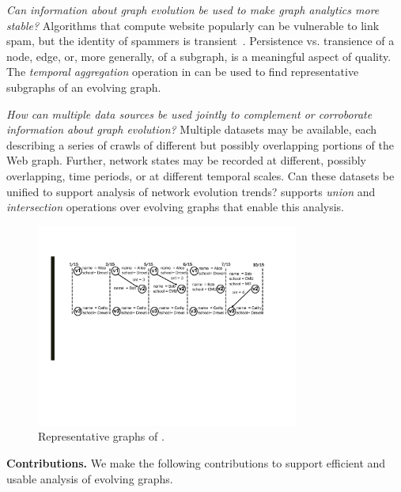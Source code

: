 {\em Can information about graph evolution be used to make graph
  analytics more stable?}  Algorithms that compute
website popularly can be vulnerable to link spam, but the identity 
of spammers is transient~\cite{DBLP:conf/cikm/YangQZGL07}.  Persistence 
vs. transience of a node, edge, or, more 
generally, of a subgraph, is a meaningful aspect of quality.  
  The {\em temporal aggregation} operation in \ql
{}can be used to find
representative subgraphs of an evolving graph.

{\em How can multiple data sources be used jointly to complement or
  corroborate information about graph evolution?}  Multiple datasets may be available, each describing a
series of crawls of different but possibly overlapping portions of
the Web graph.  Further, network states may be recorded at different,
possibly overlapping, time periods, or at different temporal scales.
Can these datasets be unified to support
analysis of network evolution trends?  \ql
supports {\em union} and {\em intersection} operations over evolving
graphs that enable this analysis.

\begin{figure}[t!]
\includegraphics[width=3.4in]{figs/T1_graphs.pdf}
\vspace{-0.5cm}
\caption{Representative graphs of \tg {}.}
\vspace{-0.4cm}
\label{fig:tg_rg}
\end{figure}

{\bf Contributions.} We make the following contributions to support
efficient and usable analysis of evolving graphs.


